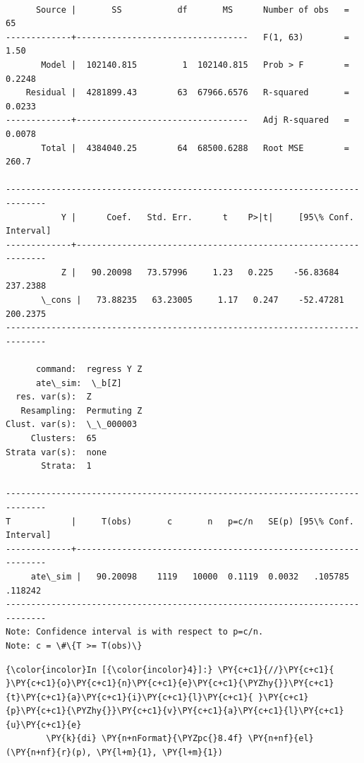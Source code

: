 \documentclass[11pt,notitlepage]{article}\usepackage[]{graphicx}\usepackage[]{color}
\makeatletter
\newenvironment{kframe}{%
 \def\at@end@of@kframe{}%
 \ifinner\ifhmode%
  \def\at@end@of@kframe{\end{minipage}}%
  \begin{minipage}{\columnwidth}%
 \fi\fi%
 \def\FrameCommand##1{\hskip\@totalleftmargin \hskip-\fboxsep
 \colorbox{shadecolor}{##1}\hskip-\fboxsep
     \hskip-\linewidth \hskip-\@totalleftmargin \hskip\columnwidth}%
 \MakeFramed {\advance\hsize-\width
   \@totalleftmargin\z@ \linewidth\hsize
   \@setminipage}}%
 {\par\unskip\endMakeFramed%
 \at@end@of@kframe}
\newenvironment{knitrout}{}{} %
\makeatother
\begin{document}
\begin{enumerate}[a)]
\begin{knitrout}
\begin{kframe}
    \begin{Verbatim}[commandchars=\\\{\}]

      Source |       SS           df       MS      Number of obs   =        65
-------------+----------------------------------   F(1, 63)        =      1.50
       Model |  102140.815         1  102140.815   Prob > F        =    0.2248
    Residual |  4281899.43        63  67966.6576   R-squared       =    0.0233
-------------+----------------------------------   Adj R-squared   =    0.0078
       Total |  4384040.25        64  68500.6288   Root MSE        =     260.7

------------------------------------------------------------------------------
           Y |      Coef.   Std. Err.      t    P>|t|     [95\% Conf. Interval]
-------------+----------------------------------------------------------------
           Z |   90.20098   73.57996     1.23   0.225    -56.83684    237.2388
       \_cons |   73.88235   63.23005     1.17   0.247    -52.47281    200.2375
------------------------------------------------------------------------------

      command:  regress Y Z
      ate\_sim:  \_b[Z]
  res. var(s):  Z
   Resampling:  Permuting Z
Clust. var(s):  \_\_000003
     Clusters:  65
Strata var(s):  none
       Strata:  1

------------------------------------------------------------------------------
T            |     T(obs)       c       n   p=c/n   SE(p) [95\% Conf. Interval]
-------------+----------------------------------------------------------------
     ate\_sim |   90.20098    1119   10000  0.1119  0.0032   .105785    .118242
------------------------------------------------------------------------------
Note: Confidence interval is with respect to p=c/n.
Note: c = \#\{T >= T(obs)\}

    \end{Verbatim}

    \begin{Verbatim}[commandchars=\\\{\}]
{\color{incolor}In [{\color{incolor}4}]:} \PY{c+c1}{//}\PY{c+c1}{ }\PY{c+c1}{o}\PY{c+c1}{n}\PY{c+c1}{e}\PY{c+c1}{\PYZhy{}}\PY{c+c1}{t}\PY{c+c1}{a}\PY{c+c1}{i}\PY{c+c1}{l}\PY{c+c1}{ }\PY{c+c1}{p}\PY{c+c1}{\PYZhy{}}\PY{c+c1}{v}\PY{c+c1}{a}\PY{c+c1}{l}\PY{c+c1}{u}\PY{c+c1}{e}
        \PY{k}{di} \PY{n+nFormat}{\PYZpc{}8.4f} \PY{n+nf}{el}(\PY{n+nf}{r}(p), \PY{l+m}{1}, \PY{l+m}{1})
\end{Verbatim}


\end{kframe}
\end{knitrout}
\end{enumerate}
\end{document}
